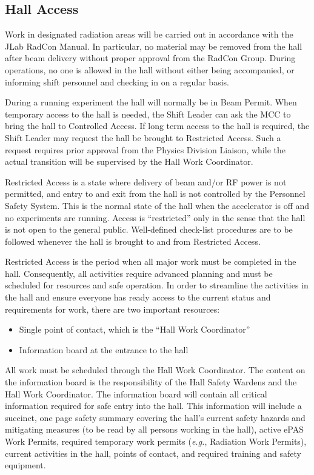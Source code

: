 \documentclass[11pt]{article}
\begin{document}
\subsection{Hall Access}
\indent

Work in designated radiation areas will be carried out in accordance with the JLab RadCon
Manual. In particular, no material may be removed from the hall after beam delivery without
proper approval from the RadCon Group. During operations, no one is allowed in the hall 
without either being accompanied, or informing shift personnel and checking in on a regular
basis. 
 
During a running experiment the hall will normally be in Beam Permit. When 
temporary access to the hall is needed, the Shift Leader can ask the MCC to 
bring the hall to Controlled Access. If long term access to the hall is
required, the Shift Leader may request the hall be brought to Restricted
Access. Such a request requires prior approval from the Physics Division
Liaison, while the actual transition will be supervised by the Hall Work
Coordinator.

Restricted Access is a state where  delivery of beam and/or RF power is not 
permitted, and entry to and exit 
from the hall is not controlled by the Personnel Safety System. This is the 
normal state of the hall when the accelerator is off and no experiments are 
running. Access is ``restricted'' only in the sense that the hall is not open 
to the general public. Well-defined check-list procedures are to
be followed whenever the hall is brought to and from Restricted Access.

Restricted Access is the period when all major work must be completed in the
hall. Consequently, all activities require advanced planning and must be 
scheduled for resources and safe operation. In order to streamline the 
activities in the hall and ensure everyone
has ready access to the current status and requirements for work, there
are two important resources: 
\begin{itemize} 
\item Single point of contact, which is the ``Hall Work Coordinator''
\item Information board at the entrance to the hall
\end{itemize}
All work must be scheduled through the Hall Work Coordinator. The content 
on the information board is the responsibility of the Hall Safety Wardens 
and the Hall Work Coordinator. The information board will contain all critical 
information required for safe entry into the hall. This information will
include a succinct, one page safety summary covering the hall's current
safety hazards and mitigating measures (to be read by all persons working
in the hall), active ePAS Work Permits, required temporary work permits 
({\it e.g.}, Radiation Work Permits), current activities in the hall, points of 
contact, and required training and safety equipment.
\end{document}
